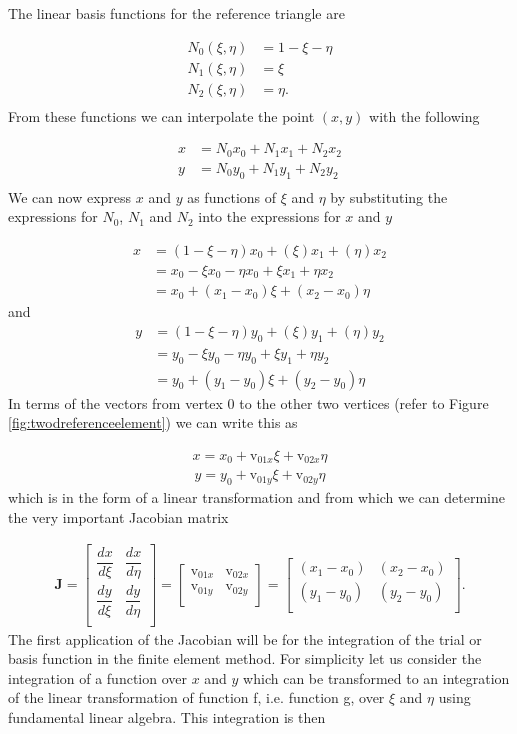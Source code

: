 \documentclass[11pt,letterpaper,titlepage]{article}
\newcommand{\beq}{\begin{equation*}
\begin{aligned}}
\newcommand{\eeq}{\end{aligned}
\end{equation*}}
\newcommand{\beqn}{\begin{equation}
	\begin{aligned}}
\newcommand{\eeqn}{\end{aligned}
	\end{equation}}
\numberwithin{equation}{section}
\begin{document}
The linear basis functions for the reference triangle are

\beq 
N_0(\xi,\eta) &= 1 - \xi - \eta \\
N_1(\xi,\eta) &= \xi \\
N_2(\xi,\eta) &= \eta. \\
\eeq 
From these functions we can interpolate the point $(x,y)$ with the following

\beq 
x &= N_0 x_0 + N_1 x_1 + N_2 x_2 \\
y &= N_0 y_0 + N_1 y_1 + N_2 y_2 \\
\eeq 
We can now express $x$ and $y$ as functions of $\xi$ and $\eta$ by substituting the expressions for $N_0$, $N_1$ and $N_2$ into the expressions for $x$ and $y$

\beq 
x &= (1-\xi-\eta)x_0 + (\xi)x_1 + (\eta)x_2 \\
&= x_0 -\xi x_0 -\eta x_0 +\xi x_1 +\eta x_2 \\
&= x_0 +(x_1 - x_0)\xi + (x_2 - x_0)\eta
\eeq 
and
\beq 
y &= (1-\xi-\eta)y_0 + (\xi)y_1 + (\eta)y_2 \\
&= y_0 -\xi y_0 -\eta y_0 +\xi y_1 +\eta y_2 \\
&= y_0 +(y_1 - y_0)\xi + (y_2 - y_0)\eta
\eeq 
\newline
In terms of the vectors from vertex $0$ to the other two vertices (refer to Figure \ref{fig:twodreferenceelement}) we can write this as

\beqn \label{eq:x2Dnat}
x = x_0 + \text{v}_{01x} \xi +\text{v}_{02x} \eta
\eeqn 
\beqn \label{eq:y2Dnat}
y = y_0 + \text{v}_{01y} \xi +\text{v}_{02y} \eta
\eeqn 
\newline
which is in the form of a linear transformation and from which we can determine the very important Jacobian matrix

\begingroup
\renewcommand*{\arraystretch}{1.5}
\beqn \label{eq:jacobiantriangle} 
\mathbf{J }= 
\begin{bmatrix}
\dfrac{dx}{d\xi}     & \dfrac{dx}{d\eta} \\
\dfrac{dy}{d\xi}     & \dfrac{dy}{d\eta} \\
\end{bmatrix}=
\begin{bmatrix}
\text{v}_{01x}  & \text{v}_{02x}  \\
\text{v}_{01y}  & \text{v}_{02y}  \\
\end{bmatrix}
=
\begin{bmatrix}
(x_1 - x_0) & (x_2 - x_0)  \\
(y_1 - y_0)  & (y_2 - y_0) \\
\end{bmatrix}.
\eeqn
\endgroup
\newline
The first application of the Jacobian will be for the integration of the trial or basis function in the finite element method. For simplicity let us consider the integration of a function over $x$ and $y$ which can be transformed to an integration of the linear transformation of function f, i.e. function g, over $\xi$ and $\eta$ using fundamental linear algebra. This integration is then
\end{document}
